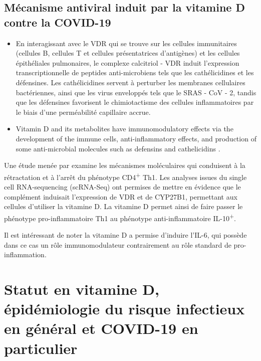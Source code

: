 \documentclass[
  a4paper,
  DIV=11,
  numbers=noendperiod,
  listof=totoc]{scrreprt}
\begin{document}
\subsection{Mécanisme antiviral induit par la vitamine D contre la
COVID-19}\label{muxe9canisme-antiviral-induit-par-la-vitamine-d-contre-la-covid-19}

\begin{itemize}
\item
  En interagissant avec le VDR qui se trouve sur les cellules
  immunitaires (cellules B, cellules T et cellules présentatrices
  d'antigènes) et les cellules épithéliales pulmonaires, le complexe
  calcitriol - VDR induit l'expression transcriptionnelle de peptides
  anti-microbiens tels que les cathélicidines et les défensines. Les
  cathélicidines servent à perturber les membranes cellulaires
  bactériennes, ainsi que les virus enveloppés tels que le SRAS - CoV -
  2, tandis que les défensines favorisent le chimiotactisme des cellules
  inflammatoires par le biais d'une perméabilité capillaire accrue.
  \autocite{Munshi.2021}
\item
  Vitamin D and its metabolites have immunomodulatory effects via the
  development of the immune cells, anti-inflammatory effects, and
  production of some anti-microbial molecules such as defensins and
  cathelicidins \autocite{Shiravi.2022}.
\end{itemize}

Une étude menée par \textcite{Chauss.2022} examine les mécanismes
moléculaires qui conduisent à la rétractation et à l'arrêt du phénotype
CD4\textsuperscript{+} \ac{Th1}. Les analyses issues du single cell
RNA-sequencing (scRNA-Seq) ont permises de mettre en évidence que le
complément induisait l'expression de \ac{VDR} et de \ac{CYP27B1},
permettant aux cellules d'utiliser la vitamine D. La vitamine D permet
ainsi de faire passer le phénotype pro-inflammatoire \ac{Th1} au
phénotype anti-inflammatoire IL-10\textsuperscript{+}.

Il est intéressant de noter la vitamine D a permise d'induire l'IL-6,
qui possède dans ce cas un rôle immunomodulateur contrairement au rôle
standard de pro-inflammation. \autocite{Chauss.2022}

\textcite{Bishop.2021}

\section{Statut en vitamine D, épidémiologie du risque infectieux en
général et COVID-19 en particulier}\label{sec-statut-vd}
\end{document}
